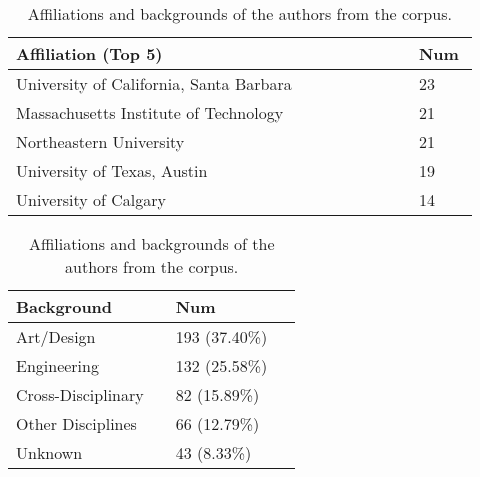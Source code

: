 \begin{table}[h]
\centering
\vspace{-0.5em}
\caption{Affiliations and backgrounds of the authors from the corpus.}
\vspace{-1em}
\begin{subtable}[t]{0.56\linewidth} %
\fontsize{6.8pt}{7pt}\selectfont
\centering
\begin{tabular}{@{}p{0.8\linewidth}p{0.12\linewidth}@{}}
\toprule
\textbf{Affiliation (Top 5)}                     & \textbf{Num} \\
\midrule
University of California, Santa Barbara & 23 \\
Massachusetts Institute of Technology   & 21 \\
Northeastern University                 & 21 \\
University of Texas, Austin             & 19 \\
University of Calgary                   & 14 \\
\bottomrule
\end{tabular}
\end{subtable}%
\hfill
\begin{subtable}[t]{0.41\linewidth} %
\fontsize{6.5pt}{7pt}\selectfont
\centering
\begin{tabular}{@{}p{0.5\linewidth}p{0.4\linewidth}@{}}
\toprule
\textbf{Background}                     & \textbf{Num} \\

\midrule
Art/Design        & 193 (37.40\%) \\
Engineering        & 132 (25.58\%) \\
Cross-Disciplinary & 82 (15.89\%) \\
Other Disciplines              & 66 (12.79\%) \\
Unknown            & 43 (8.33\%) \\
\bottomrule
\end{tabular}
\end{subtable}
\vspace{-2em}
\label{tab:authors}
\end{table}





